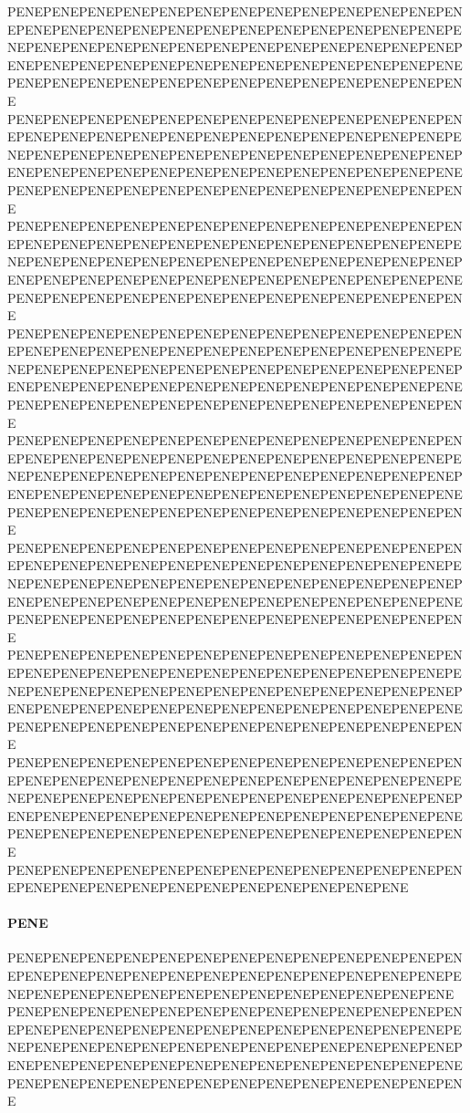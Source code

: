 PENEPENEPENEPENEPENEPENEPENEPENEPENEPENEPENEPENEPENEPENEPENEPENEPENEPENEPENEPENEPENEPENEPENEPENEPENEPENEPENEPENEPENEPENEPENEPENEPENEPENEPENEPENEPENEPENEPENEPENEPENEPENEPENEPENEPENEPENEPENEPENEPENEPENEPENEPENEPENEPENEPENEPENEPENEPENEPENEPENEPENEPENEPENEPENE
PENEPENEPENEPENEPENEPENEPENEPENEPENEPENEPENEPENEPENEPENEPENEPENEPENEPENEPENEPENEPENEPENEPENEPENEPENEPENEPENEPENEPENEPENEPENEPENEPENEPENEPENEPENEPENEPENEPENEPENEPENEPENEPENEPENEPENEPENEPENEPENEPENEPENEPENEPENEPENEPENEPENEPENEPENEPENEPENEPENEPENEPENEPENEPENE
PENEPENEPENEPENEPENEPENEPENEPENEPENEPENEPENEPENEPENEPENEPENEPENEPENEPENEPENEPENEPENEPENEPENEPENEPENEPENEPENEPENEPENEPENEPENEPENEPENEPENEPENEPENEPENEPENEPENEPENEPENEPENEPENEPENEPENEPENEPENEPENEPENEPENEPENEPENEPENEPENEPENEPENEPENEPENEPENEPENEPENEPENEPENEPENE
PENEPENEPENEPENEPENEPENEPENEPENEPENEPENEPENEPENEPENEPENEPENEPENEPENEPENEPENEPENEPENEPENEPENEPENEPENEPENEPENEPENEPENEPENEPENEPENEPENEPENEPENEPENEPENEPENEPENEPENEPENEPENEPENEPENEPENEPENEPENEPENEPENEPENEPENEPENEPENEPENEPENEPENEPENEPENEPENEPENEPENEPENEPENEPENE
PENEPENEPENEPENEPENEPENEPENEPENEPENEPENEPENEPENEPENEPENEPENEPENEPENEPENEPENEPENEPENEPENEPENEPENEPENEPENEPENEPENEPENEPENEPENEPENEPENEPENEPENEPENEPENEPENEPENEPENEPENEPENEPENEPENEPENEPENEPENEPENEPENEPENEPENEPENEPENEPENEPENEPENEPENEPENEPENEPENEPENEPENEPENEPENE
PENEPENEPENEPENEPENEPENEPENEPENEPENEPENEPENEPENEPENEPENEPENEPENEPENEPENEPENEPENEPENEPENEPENEPENEPENEPENEPENEPENEPENEPENEPENEPENEPENEPENEPENEPENEPENEPENEPENEPENEPENEPENEPENEPENEPENEPENEPENEPENEPENEPENEPENEPENEPENEPENEPENEPENEPENEPENEPENEPENEPENEPENEPENEPENE
PENEPENEPENEPENEPENEPENEPENEPENEPENEPENEPENEPENEPENEPENEPENEPENEPENEPENEPENEPENEPENEPENEPENEPENEPENEPENEPENEPENEPENEPENEPENEPENEPENEPENEPENEPENEPENEPENEPENEPENEPENEPENEPENEPENEPENEPENEPENEPENEPENEPENEPENEPENEPENEPENEPENEPENEPENEPENEPENEPENEPENEPENEPENEPENE
PENEPENEPENEPENEPENEPENEPENEPENEPENEPENEPENEPENEPENEPENEPENEPENEPENEPENEPENEPENEPENEPENEPENEPENEPENEPENEPENEPENEPENEPENEPENEPENEPENEPENEPENEPENEPENEPENEPENEPENEPENEPENEPENEPENEPENEPENEPENEPENEPENEPENEPENEPENEPENEPENEPENEPENEPENEPENEPENEPENEPENEPENEPENEPENE
PENEPENEPENEPENEPENEPENEPENEPENEPENEPENEPENEPENEPENEPENEPENEPENEPENEPENEPENEPENEPENEPENEPENEPENE\paragraph{PENE}
PENEPENEPENEPENEPENEPENEPENEPENEPENEPENEPENEPENEPENEPENEPENEPENEPENEPENEPENEPENEPENEPENEPENEPENEPENEPENEPENEPENEPENEPENEPENEPENEPENEPENEPENEPENEPENEPENE
PENEPENEPENEPENEPENEPENEPENEPENEPENEPENEPENEPENEPENEPENEPENEPENEPENEPENEPENEPENEPENEPENEPENEPENEPENEPENEPENEPENEPENEPENEPENEPENEPENEPENEPENEPENEPENEPENEPENEPENEPENEPENEPENEPENEPENEPENEPENEPENEPENEPENEPENEPENEPENEPENEPENEPENEPENEPENEPENEPENEPENEPENEPENEPENE
